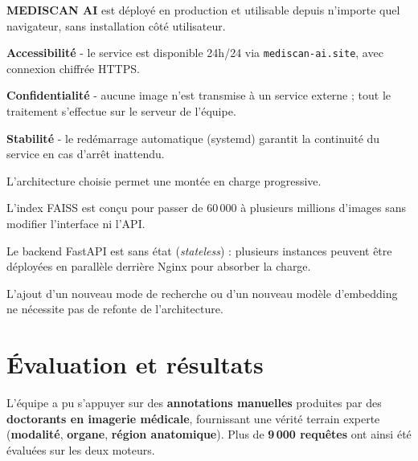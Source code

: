 \documentclass[12pt,a4paper]{article}
\newcommand{\NewMajorPart}{\clearpage}
\begin{document}
\vspace{0.2cm}
\textbf{MEDISCAN AI} est déployé en production et utilisable depuis n'importe quel navigateur,
sans installation côté utilisateur.

\begin{sq}
  \item \textbf{Accessibilité} - le service est disponible 24h/24 via
        \texttt{mediscan-ai.site}, avec connexion chiffrée HTTPS.
  \item \textbf{Confidentialité} - aucune image n'est transmise à un service externe ;
        tout le traitement s'effectue sur le serveur de l'équipe.
  \item \textbf{Stabilité} - le redémarrage automatique (systemd) garantit
        la continuité du service en cas d'arrêt inattendu.
\end{sq}

\vspace{0.2cm}
L'architecture choisie permet une montée en charge progressive.

\begin{sq}
  \item L'index FAISS est conçu pour passer de 60\,000 à plusieurs millions d'images
        sans modifier l'interface ni l'API.
  \item Le backend FastAPI est sans état (\textit{stateless}) : plusieurs instances
        peuvent être déployées en parallèle derrière Nginx pour absorber la charge.
  \item L'ajout d'un nouveau mode de recherche ou d'un nouveau modèle d'embedding
        ne nécessite pas de refonte de l'architecture.
\end{sq}

\NewMajorPart
\section{Évaluation et résultats}

\vspace{0.2cm}
L'équipe a pu s'appuyer sur des \textbf{annotations manuelles} produites par des
\textbf{doctorants en imagerie médicale}, fournissant une vérité terrain experte
(\textbf{modalité}, \textbf{organe}, \textbf{région anatomique}). Plus de \textbf{9\,000 requêtes}
ont ainsi été évaluées sur les deux moteurs.

\vspace{0.5cm}
\end{document}

